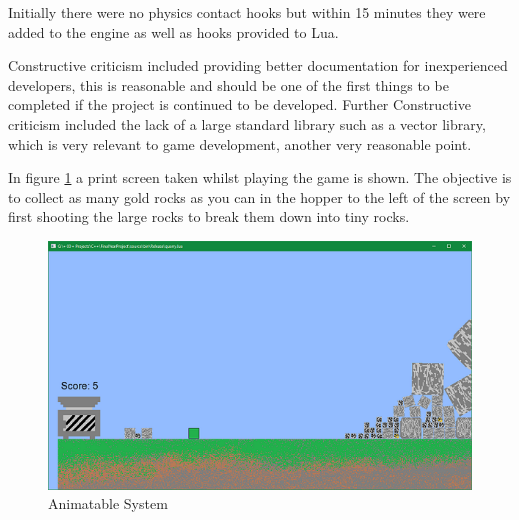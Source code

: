 \documentclass[11pt,a4paper,titlepage]{report}
\begin{document}
	Initially there were no physics contact hooks but within 15 minutes they were added to the engine as well as hooks provided to Lua.

	Constructive criticism included providing better documentation for inexperienced developers, this is reasonable and should be one of the first things to be completed if the project is continued to be developed. Further Constructive criticism included the lack of a large standard library such as a vector library, which is very relevant to game development, another very reasonable point. 
	
	In figure \ref{fig:Game1} a print screen taken whilst playing the game is shown. The objective is to collect as many gold rocks as you can in the hopper to the left of the screen by first shooting the large rocks to break them down into tiny rocks.

	\begin{figure}[h] 
		\centering
		\includegraphics[scale=0.75]{game1}
		\caption{Animatable System}
		\label{fig:Game1}
	\end{figure}




\end{document}
